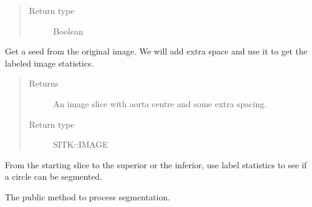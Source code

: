 \documentclass[letterpaper,10pt,english]{sphinxmanual}
\begin{document}
\begin{fulllineitems}
\begin{fulllineitems}
\begin{quote}
\begin{description}
\item[{Return type}] \leavevmode
\sphinxAtStartPar
Boolean

\end{description}\end{quote}

\end{fulllineitems}


\begin{fulllineitems}
\label{\detokenize{AortaGeomReconDisplayModuleLib:AortaSegmenter.AortaSegmenter.__prepare_seed}}
\sphinxAtStartPar
Get a seed from the original image. We will add extra space
and use it to get the labeled image statistics.
\begin{quote}\begin{description}
\item[{Returns}] \leavevmode
\sphinxAtStartPar
An image slice with aorta centre and some extra spacing.

\item[{Return type}] \leavevmode
\sphinxAtStartPar
SITK::IMAGE

\end{description}\end{quote}

\end{fulllineitems}


\begin{fulllineitems}
\label{\detokenize{AortaGeomReconDisplayModuleLib:AortaSegmenter.AortaSegmenter.__segmentation}}
\sphinxAtStartPar
From the starting slice to the superior or the inferior,
use label statistics to see if a circle can be segmented.

\end{fulllineitems}


\begin{fulllineitems}
\label{\detokenize{AortaGeomReconDisplayModuleLib:AortaSegmenter.AortaSegmenter.begin_segmentation}}
\sphinxAtStartPar
The public method to process segmentation.


\end{fulllineitems}
\end{fulllineitems}
\end{document}
